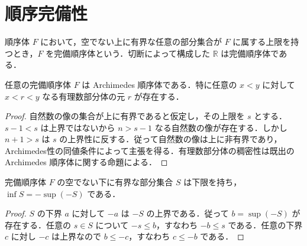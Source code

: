 \section{順序完備性}
\begin{defn}[完備順序体]
順序体 $F$ において，空でない上に有界な任意の部分集合が $F$ に属する上限を持つとき，$F$ を完備順序体という．切断によって構成した $\mathbb R$ は完備順序体である．
\end{defn}
\begin{prop}[完備順序体のArchimedes性]
任意の完備順序体 $F$ は Archimedes 順序体である．特に任意の $x<y$ に対して $x<r<y$ なる有理数部分体の元 $r$ が存在する．
\end{prop}
\begin{proof}
自然数の像の集合が上に有界であると仮定し，その上限を $s$ とする．$s-1<s$ は上界ではないから $n>s-1$ なる自然数の像が存在する．しかし $n+1>s$ は $s$ の上界性に反する．従って自然数の像は上に非有界であり，Archimedes性の同値条件によって主張を得る．有理数部分体の稠密性は既出の Archimedes 順序体に関する命題による．
\end{proof}
\begin{prop}[下限の存在]
完備順序体 $F$ の空でない下に有界な部分集合 $S$ は下限を持ち，$\inf S=-\sup(-S)$ である．
\end{prop}
\begin{proof}
$S$ の下界 $a$ に対して $-a$ は $-S$ の上界である．従って $b=\sup(-S)$ が存在する．任意の $s\in S$ について $-s\leq b$，すなわち $-b\leq s$ である．任意の下界 $c$ に対し $-c$ は上界なので $b\leq-c$，すなわち $c\leq-b$ である．
\end{proof}
